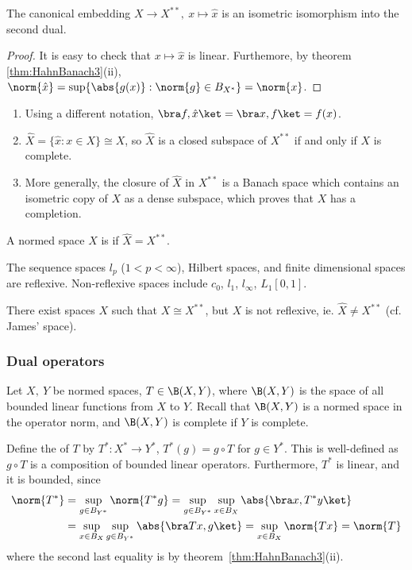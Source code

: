 \documentclass[a4paper]{article}
\begin{document}
\begin{nthm}\label{thm:Bidual}
  The canonical embedding $X\to X^{**},\ x\mapsto\hat{x}$ is an isometric isomorphism into the second dual.
\end{nthm}

\begin{proof}
  It is easy to check that $x\mapsto\hat{x}$ is linear. Furthemore, by theorem \ref{thm:HahnBanach3}(ii), $\norm{\hat{x}}=\sup\{\abs{g(x)}:\norm{g}\in B_{X^*}\}=\norm{x}$.
\end{proof}

\begin{remark}
  \begin{enumerate}[label=(\arabic*)]
    \item Using a different notation, $\bra f,\hat{x}\ket=\bra x,f\ket=f(x)$.
    \item $\hat{X}=\{\hat{x}:x\in X\}\cong X$, so $\hat{X}$ is a closed subspace of $X^{**}$ if and only if $X$ is complete.
    \item More generally, the closure of $\hat{X}$ in $X^{**}$ is a Banach space which contains an isometric copy of $X$ as a dense subspace, which proves that $X$ has a completion.
  \end{enumerate}
\end{remark}

\begin{defi}
A normed space $X$ is  if $\hat{X}=X^{**}$.
\end{defi}
\begin{eg}
The sequence spaces $l_p$ ($1<p<\infty$), Hilbert spaces, and finite dimensional spaces are reflexive. Non-reflexive spaces include $c_0$, $l_1$, $l_\infty$, $L_1[0,1]$.
\end{eg}
\begin{warning}
There exist spaces $X$ such that $X\cong X^{**}$, but $X$ is not reflexive, ie. $\widehat{X}\not= X^{**}$ (cf. James' space).
\end{warning}

\subsubsection*{Dual operators}
Let $X,\ Y$ be normed spaces, $T\in\B(X,Y)$, where $\B(X,Y)$ is the space of all bounded linear functions from $X$ to $Y$. Recall that $\B(X,Y)$ is a normed space in the operator norm, and $\B(X,Y)$ is complete if $Y$ is complete.

Define the  of $T$ by $T^*:X^*\to Y^*$, $T^*(g)=g\circ T$ for $g\in Y^*$. This is well-defined as $g\circ T$ is a composition of bounded linear operators. Furthermore, $T^*$ is linear, and it is bounded, since
\begin{align*}
  \norm{T^*}&=\sup_{g\in B_{Y^*}}\norm{T^*g}=\sup_{g\in B_{Y^*}}\sup_{x\in B_X}\abs{\bra x,T^*y\ket}\\
  &=\sup_{x\in B_X}\sup_{g\in B_{Y^*}}\abs{\bra Tx,g\ket}=\sup_{x\in B_X}\norm{Tx}=\norm{T}
\end{align*}
where the second last equality is by theorem~\ref{thm:HahnBanach3}(ii).
\end{document}
